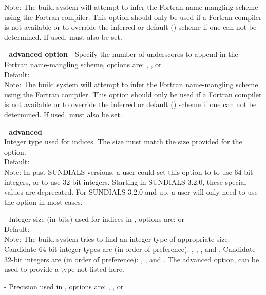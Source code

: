 \begin{description}
  Note: The build system will attempt to infer the Fortran
  name-mangling scheme using the Fortran compiler. This option should
  only be used if a Fortran compiler is not available or to override
  the inferred or default () scheme if one can not be
  determined. If used,  must also
  be set.
\item[\id{SUNDIALS\_F77\_FUNC\_UNDERSCORES}] - \textbf{advanced option} -
  Specify the number of underscores to append in the Fortran
  name-mangling scheme, options are: , , or 
  \\
  Default:
  \\
  Note: The build system will attempt to infer the Fortran
  name-mangling scheme using the Fortran compiler. This option should
  only be used if a Fortran compiler is not available or to override
  the inferred or default () scheme if one can not be
  determined. If used,  must also be set.
\item[\id{SUNDIALS\_INDEX\_TYPE}] - \textbf{advanced}
  \\
  Integer type used for {\sundials} indices. The size must match the size provided for
  the \\ \noindent {} option.
  \\
  Default:
  \\
  Note:
  In past SUNDIALS versions, a user could set this option to  to use 64-bit
  integers, or  to use 32-bit integers. Starting in SUNDIALS 3.2.0, these 
  special values are deprecated. For SUNDIALS 3.2.0 and up, a user will only need to use
  the  option in most cases.
\item[\id{SUNDIALS\_INDEX\_SIZE}] -
  Integer size (in bits) used for indices in {\sundials}, options are:  or 
  \\
  Default: 
  \\
  Note: 
  The build system tries to find an integer type of appropriate size. Candidate 64-bit
  integer types are (in order of preference): , , , and . 
  Candidate 32-bit integers are (in order of preference): , , and .
  The advanced option,  can be used to provide a type not listed here.
\item[\id{SUNDIALS\_PRECISION}] -   
  Precision used in {\sundials}, options are: , , or 

\end{description}
